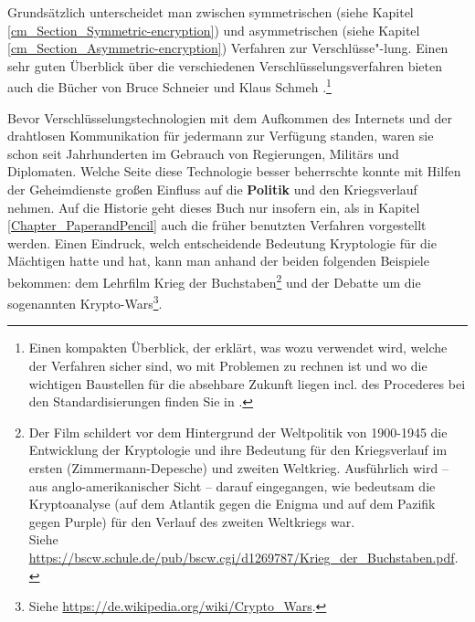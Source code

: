 \begin{refsegment}
Grundsätzlich unterscheidet man zwischen symmetrischen
(siehe Kapitel \ref{cm_Section_Symmetric-encryption}) und asymmetrischen
(siehe Kapitel \ref{cm_Section_Asymmetric-encryption})
Verfahren zur Verschlüsse"-lung.
Einen sehr guten Überblick über die verschiedenen Verschlüsselungsverfahren
bieten auch die Bücher von Bruce Schneier \cite{Schneier1996} und Klaus Schmeh
\cite{Schm2016}.\footnote{%
  Einen kompakten Überblick, der erklärt, was wozu verwendet wird, welche der Verfahren
  sicher sind, wo mit Problemen zu rechnen ist und wo die wichtigen Baustellen für die
  absehbare Zukunft liegen incl. des Procederes bei den Standardisierungen finden Sie
  in \cite{Schmidt2016}.
}

Bevor Verschlüsselungstechnologien mit dem Aufkommen des Internets und der drahtlosen
Kommunikation für jedermann zur Verfügung standen, waren sie schon seit Jahrhunderten
im Gebrauch von Regierungen, Militärs und Diplomaten. Welche Seite diese Technologie
besser beherrschte konnte mit Hilfen der Geheimdienste großen Einfluss auf die \textbf{Politik}
und den Kriegsverlauf nehmen. Auf die Historie geht dieses Buch nur insofern ein, als
in Kapitel \ref{Chapter_PaperandPencil} auch die früher benutzten Verfahren vorgestellt
werden. Einen Eindruck, welch entscheidende Bedeutung Kryptologie für die Mächtigen
hatte und hat, kann man anhand der beiden folgenden Beispiele bekommen: dem Lehrfilm
\glqq Krieg der Buchstaben\grqq\footnote{%
  Der Film  schildert vor dem Hintergrund der Weltpolitik
  von 1900-1945 die Entwicklung der Kryptologie und ihre Bedeutung für den
  Kriegsverlauf im ersten (Zimmermann-Depesche) und zweiten Weltkrieg. Ausführlich
  wird -- aus anglo-amerikanischer Sicht -- darauf eingegangen, wie bedeutsam die
  Kryptoanalyse (auf dem Atlantik gegen die Enigma und auf dem Pazifik gegen Purple)
  für den Verlauf des zweiten Weltkriegs war.\\
  Siehe \url{https://bscw.schule.de/pub/bscw.cgi/d1269787/Krieg_der_Buchstaben.pdf}.
}
und der Debatte um die sogenannten Krypto-Wars\footnote{%
  Siehe \url{https://de.wikipedia.org/wiki/Crypto_Wars}.
}.



\end{refsegment}
